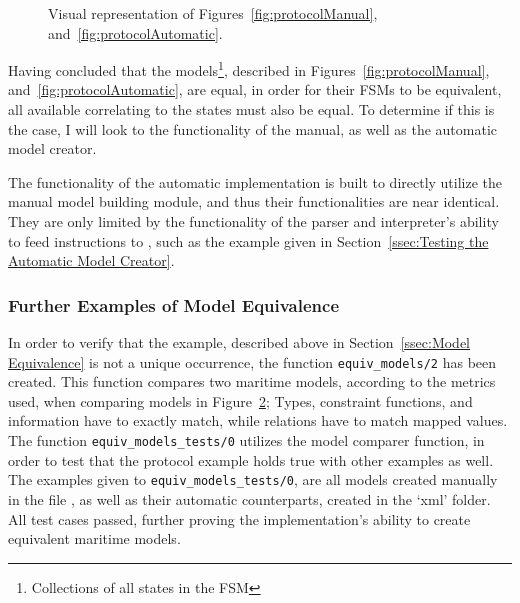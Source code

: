 \begin{figure}[h]
\begin{subfigure}{.48\textwidth}
    \caption{}
    \label{subfig:protocolAutomaticVisual}
  \end{subfigure}
  \caption{Visual representation of Figures~\ref{fig:protocolManual}, and~\ref{fig:protocolAutomatic}.}
  \label{fig:protocolVisual}
\end{figure}
Having concluded that the models\footnote{Collections of all states in the FSM}, described in Figures~\ref{fig:protocolManual}, and~\ref{fig:protocolAutomatic}, are equal, in order for their FSMs to be equivalent, all available  correlating to the states must also be equal. To determine if this is the case, I will look to the functionality of the manual, as well as the automatic model creator. 

The functionality of the automatic implementation is built to directly utilize the manual model building module, and thus their functionalities are near identical. They are only limited by the functionality of the parser and interpreter's ability to feed instructions to , such as the example given in Section~\ref{ssec:Testing the Automatic Model Creator}.
\newpage
\subsubsection{Further Examples of Model Equivalence}

In order to verify that the example, described above in Section~\ref{ssec:Model Equivalence} is not a unique occurrence, the function \lstinline{equiv_models/2} has been created. This function compares two maritime models, according to the metrics used, when comparing models in Figure~\ref{fig:protocolVisual}; Types, constraint functions, and information have to exactly match, while relations have to match mapped values. The function \lstinline{equiv_models_tests/0} utilizes the model comparer function, in order to test that the protocol example holds true with other examples as well. The examples given to \lstinline{equiv_models_tests/0}, are all models created manually in the file , as well as their automatic counterparts, created in the `xml' folder. All test cases passed, further proving the implementation's ability to create equivalent maritime models.
